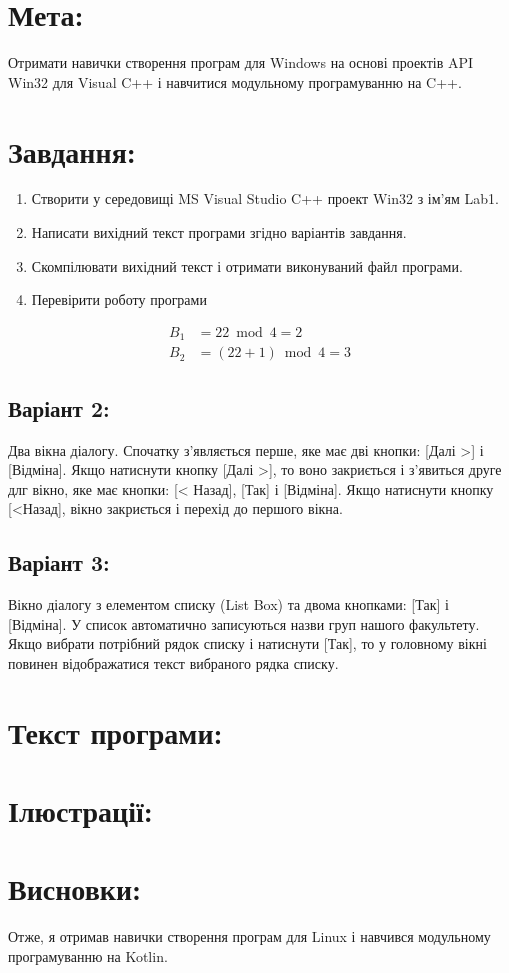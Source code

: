 \documentclass[14pt]{article}
\begin{document}


\tableofcontents
\newpage

\section{Мета:}
Отримати навички створення програм для Windows на основі проектів API
Win32 для Visual C++ і навчитися модульному програмуванню на C++.
\section{Завдання:}
\begin{enumerate}
    \item Створити у середовищі MS Visual Studio C++ проект Win32 з ім’ям Lab1.
    \item Написати вихідний текст програми згідно варіантів завдання.
    \item Скомпілювати вихідний текст і отримати виконуваний файл програми.
    \item Перевірити роботу програми
\end{enumerate}

\begin{align}
    B_1 &= 22 \bmod 4 = 2 \\
    B_2 &= (22+1) \bmod 4 = 3    
\end{align}

\subsection{Варіант 2:}
Два вікна діалогу. Спочатку
з’являється перше, яке має дві
кнопки: [Далі >] і [Відміна].
Якщо натиснути кнопку [Далі
>], то воно закриється і
з’явиться друге длг вікно, яке
має кнопки: [< Назад], [Так] і
[Відміна]. Якщо натиснути
кнопку [<Назад], вікно
закриється і перехід до
першого вікна.
\subsection{Варіант 3:}
Вікно діалогу з елементом
списку (List Box) та двома
кнопками: [Так] і [Відміна]. У
список автоматично
записуються назви груп
нашого факультету. Якщо
вибрати потрібний рядок
списку і натиснути [Так], то у
головному вікні повинен
відображатися текст
вибраного рядка списку.

\section{Текст програми:}


\section{Ілюстрації:}

\section{Висновки:}
Отже, я отримав навички створення програм для Linux і навчився модульному програмуванню на Kotlin.
\end{document}
